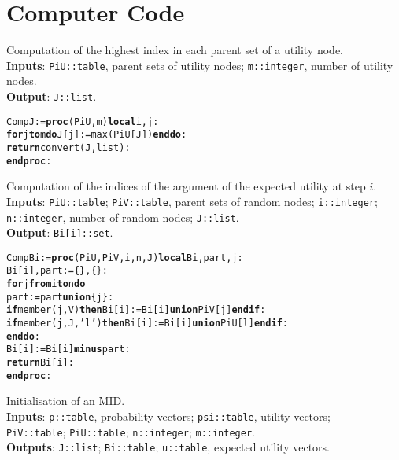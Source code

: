 
\chapter{Computer Code} %

\label{appendixD} %



\noindent Computation of the highest index in each parent set of a utility node.\\
\textbf{Inputs}: \verb|PiU::table|, parent sets of utility nodes;
\verb|m::integer|, number of utility nodes.\\
\textbf{Output}: \verb|J::list|.

\vspace{-0.4cm}
\begin{alltt}
CompJ := \textbf{proc}(PiU,m) \textbf{local} i,j:
\textbf{for} j  \textbf{to} m \textbf{do} J[j] := max(PiU[J]) \textbf{end do}:
\textbf{return} convert(J,list):
\textbf{end proc}:
\end{alltt}


\noindent Computation of the indices of the argument of the expected utility at step $i$. \\
 \textbf{Inputs}: \verb|PiU::table|; \verb|PiV::table|, parent sets of random nodes; \verb|i::integer|;\\
\verb|n::integer|, number of random nodes; \verb|J::list|.\\
\textbf{Output}: \verb|Bi[i]::set|.

\vspace{-0.4cm}
\begin{alltt}
CompBi := \textbf{proc}(PiU,PiV,i,n,J) \textbf{local} Bi, part, j:
Bi[i], part := \{\},\{\}:
\textbf{for} j \textbf{from} i \textbf{to} n \textbf{do}
  part := part \textbf{union} \{j\}:
  \textbf{if} member(j,V) \textbf{then} Bi[i] := Bi[i] \textbf{union} PiV[j] \textbf{end if}:
  \textbf{if} member(j,J,'l') \textbf{then} Bi[i] := Bi[i] \textbf{union} PiU[l] \textbf{end if}:
\textbf{end do}:
Bi[i] := Bi[i] \textbf{minus} part:
\textbf{return} Bi[i]:
\textbf{end proc}:
\end{alltt}


Initialisation of an MID.\\
\textbf{Inputs}: \verb|p::table|, probability vectors; \verb|psi::table|, utility vectors; \\
\verb|PiV::table|; \verb|PiU::table|; \verb|n::integer|; \verb|m::integer|.\\
\textbf{Outputs}: \verb|J::list|; \verb|Bi::table|; \verb|u::table|, expected utility vectors.

